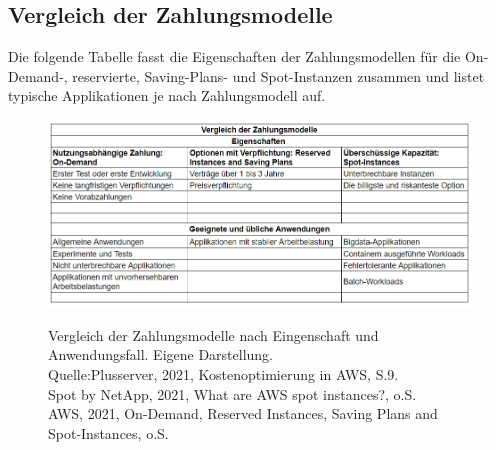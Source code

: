 \subsection*{Vergleich der Zahlungsmodelle}
Die folgende Tabelle fasst die Eigenschaften der Zahlungsmodellen für die On-Demand-, reservierte, Saving-Plans- und Spot-Instanzen zusammen und listet typische Applikationen je nach Zahlungsmodell auf.
\begin{figure}[h!]
    \centering
    \includegraphics[scale=0.57]{sources/Vergleich_der_Zahlungsmodelle}\label{fig:Vergleich_der_Zahlungsmodelle}\\
    \caption[Vergleich der Zahlungsmodelle]{}
    \begin{footnotesize}   
    \label{fig:Vergleich_der_Zahlungsmodelle}  Vergleich der Zahlungsmodelle nach Eingenschaft und Anwendungsfall. Eigene Darstellung.\\
Quelle:Plusserver, 2021, Kostenoptimierung in AWS, S.9.\cite{PS1}\\
Spot by NetApp, 2021, What are AWS spot instances?, o.S.\cite{SPOT1}\\
AWS, 2021, On-Demand, Reserved Instances, Saving Plans and Spot-Instances, o.S.\cite{AMZ02, AMZ07, AMZ11, AMZ19}
\end{footnotesize}
\end{figure}
%

\newpage
